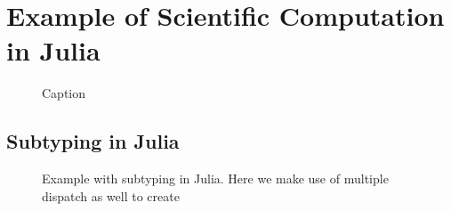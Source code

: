 \chapter{Example of Scientific Computation in Julia}
\label{app:jlscicomp}

\begin{figure}[h]
    \centering
    
    \caption{Caption}
    \label{fig:enter-label}
\end{figure}

\section{Subtyping in Julia}
\label{app:subtyping}

\begin{figure}[h]
    \centering
    
    \caption{Example with subtyping in Julia. Here we make use of multiple dispatch as well to create }
    \label{fig:subtyping}
\end{figure}